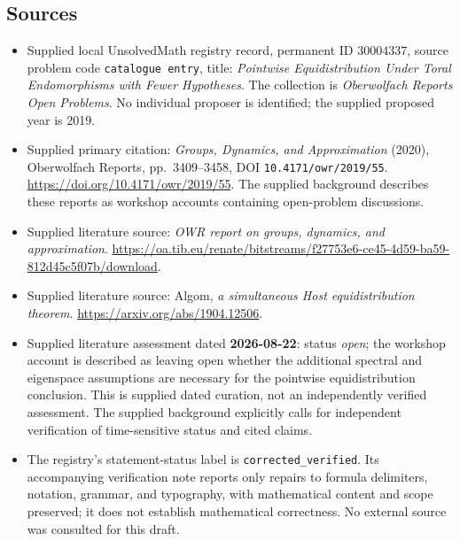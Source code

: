 \documentclass[11pt]{article}
\begin{document}
\subsection{Sources}
\begin{itemize}
\item Supplied local UnsolvedMath registry record, permanent ID \(30004337\), source problem code \texttt{catalogue entry}, title: \emph{Pointwise Equidistribution Under Toral Endomorphisms with Fewer Hypotheses}. The collection is \emph{Oberwolfach Reports Open Problems}. No individual proposer is identified; the supplied proposed year is 2019.
\item Supplied primary citation: \emph{Groups, Dynamics, and Approximation} (2020), Oberwolfach Reports, pp.\ 3409--3458, DOI \texttt{10.4171/owr/2019/55}. \url{https://doi.org/10.4171/owr/2019/55}. The supplied background describes these reports as workshop accounts containing open-problem discussions.
\item Supplied literature source: \emph{OWR report on groups, dynamics, and approximation}. \url{https://oa.tib.eu/renate/bitstreams/f27753e6-ce45-4d59-ba59-812d45c5f07b/download}.
\item Supplied literature source: Algom, \emph{a simultaneous Host equidistribution theorem}. \url{https://arxiv.org/abs/1904.12506}.
\item Supplied literature assessment dated \textbf{2026-08-22}: status \emph{open}; the workshop account is described as leaving open whether the additional spectral and eigenspace assumptions are necessary for the pointwise equidistribution conclusion. This is supplied dated curation, not an independently verified assessment. The supplied background explicitly calls for independent verification of time-sensitive status and cited claims.
\item The registry's statement-status label is \texttt{corrected\_verified}. Its accompanying verification note reports only repairs to formula delimiters, notation, grammar, and typography, with mathematical content and scope preserved; it does not establish mathematical correctness. No external source was consulted for this draft.
\end{itemize}
\end{document}
